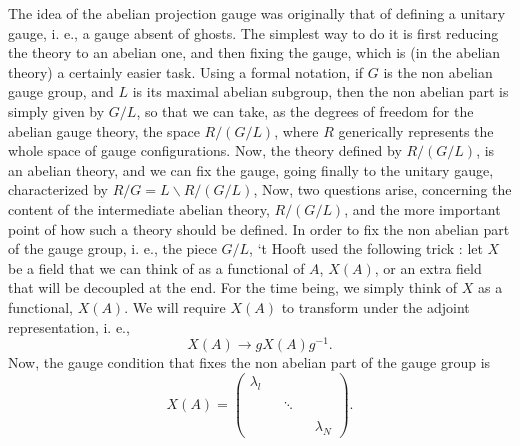The idea of the abelian projection gauge was originally that of
defining a unitary gauge, i. e., a gauge absent of ghosts. The
simplest way to do it is first reducing the theory to an abelian
one, and then fixing the gauge, which is (in the abelian theory)
a certainly easier task. Using a formal notation, if $G$ is the
non abelian gauge group, and $L$ is its maximal abelian subgroup,
then the non abelian part is simply given by $G/L$, so that we
can take, as the degrees of freedom for the abelian gauge theory,
the space $R/(G/L)$, where $R$ generically represents the whole
space of gauge configurations. Now, the theory defined by
$R/(G/L)$, is an abelian theory, and we can fix the gauge, going
finally to the unitary gauge, characterized by $R/G=L\backslash
R/(G/L)$, Now, two questions arise, concerning 
the content of the intermediate abelian
theory, $R/(G/L)$, and the more important point of how such a theory
should be defined. In order to fix the non abelian part of the
gauge group, i. e., the piece $G/L$, `t Hooft used the following
trick \cite{tHap}: let $X$ be a field that we can think of as a functional of
$A$, $X(A)$, or an extra field that will be decoupled at the end.
For the time being, we simply think of $X$ as a functional,
$X(A)$. We will require $X(A)$ to transform under the adjoint
representation, i. e.,
\begin{equation}
X(A) \rightarrow g X(A)g^{-1}.
\label{eq:II80}
\end{equation}
Now, the gauge condition that fixes the non abelian part of the
gauge group is 
\begin{equation}
X(A) =  \left( \begin{array}{ccccc} \lambda_l &   &   &     &    \\
					      &   &   &     &    \\
					      &   & \ddots   &     &    \\
					      &   &   &     &    \\
					      &   &   &     & \lambda_N
	\end{array} \right). 
\label{eq:II81}
\end{equation}
  
